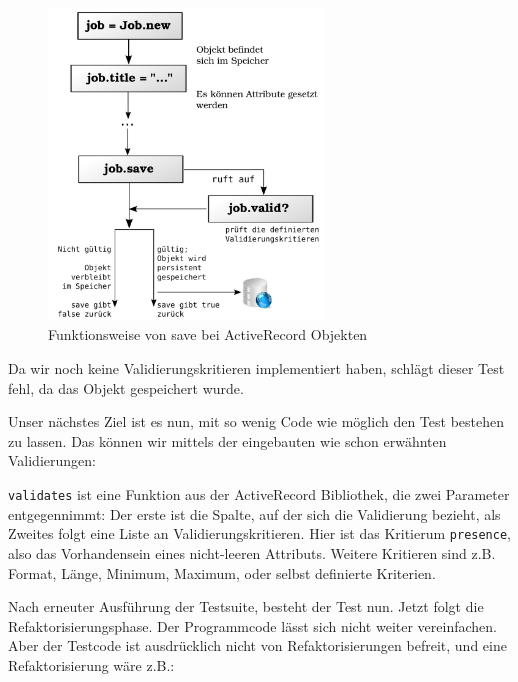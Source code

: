 \begin{figure}[hbp]
 \centering
 \includegraphics[width=0.65\textwidth]{./diagrams/activerecord-save.pdf}
 \caption{Funktionsweise von save bei ActiveRecord Objekten}
 \label{fig:activerecordsave}
\end{figure}

Da wir noch keine Validierungskritieren implementiert haben, schlägt dieser Test fehl, da das Objekt gespeichert wurde.

Unser nächstes Ziel ist es nun, mit so wenig Code wie möglich den Test bestehen zu lassen. Das können wir mittels der eingebauten wie schon erwähnten Validierungen:

\begin{ruby}[label=app/models/job.rb]
   
      
\end{ruby}
\texttt{validates} ist eine Funktion aus der ActiveRecord Bibliothek, die zwei Parameter entgegennimmt: Der erste ist die Spalte, auf der sich die Validierung bezieht, als Zweites folgt eine Liste an Validierungskritieren. Hier ist das Kritierum \texttt{presence}, also das Vorhandensein eines nicht-leeren Attributs. Weitere Kritieren sind z.B. Format, Länge, Minimum, Maximum, oder selbst definierte Kriterien.

\tddgreen
Nach erneuter Ausführung der Testsuite, besteht der Test nun. Jetzt folgt die Refaktorisierungsphase. Der Programmcode lässt sich nicht weiter vereinfachen. Aber der Testcode ist ausdrücklich nicht von Refaktorisierungen befreit, und eine Refaktorisierung wäre z.B.:
\tddrefactor
\begin{ruby}[label=test/unit/job\_test.rb]
  
       
   
\end{ruby}

